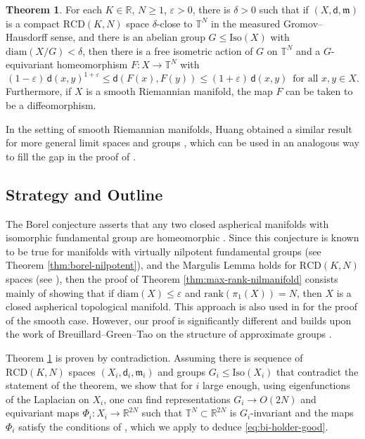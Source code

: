 \documentclass[12pt]{amsart}
\theoremstyle{definition}
\newtheorem{mainthm}{Theorem}
\numberwithin{equation}{section}
\newcommand{\rank}{{\text{rank}}}
\newcommand{\diam}{{\text {diam}}}
\newcommand{\iso}{\text{Iso}}
\newcommand{\rcd}{\text{RCD}}
\newcommand{\mm}{\mathfrak{m}}
\begin{document}
\begin{mainthm}\label{thm:equivariant-torus}
    For each $K \in \mathbb{R}$, $N \geq 1$, $\varepsilon > 0 $, there is $\delta > 0 $ such that if  $(X, \mathsf{d}, \mm  )$ is a compact $\rcd (K,N)$ space $\delta$-close to $\mathbb{T}^N$ in the measured Gromov--Hausdorff sense,  and  there is an abelian group $G \leq \iso (X)$ with $\diam (X / G ) < \delta $, then there is a free isometric action of $G$ on $\mathbb{T}^N$ and a $G$-equivariant homeomorphism $F : X \to \mathbb{T}^N$ with 
    \begin{equation}\label{eq:bi-holder-good}
         (1 - \varepsilon ) \, \mathsf{d}( x,y ) ^{1 + \varepsilon } \leq \mathsf{d}( F (x), F (y)  ) \leq (1 + \varepsilon ) \, \mathsf{d}(x,y) \, \text{ for all } x,y \in X.  
    \end{equation} 
    Furthermore, if $X$ is a smooth Riemannian manifold, the map $F$ can be taken to be a diffeomorphism.     
\end{mainthm}



    In the setting of smooth Riemannian manifolds, Huang obtained a similar result for more general limit spaces and groups  \cite[Corollary 1.9]{huang}, which can be used in an analogous way to fill the gap in the proof of  \cite[Theorem A.1.13]{cheeger-colding-i}.

\subsection{Strategy and Outline}\label{subsec:outline}

The Borel conjecture asserts that any two closed aspherical manifolds with isomorphic fundamental group are homeomorphic \cite{rosenberg}. Since this conjecture is known to be true for manifolds with virtually nilpotent fundamental groups (see Theorem \ref{thm:borel-nilpotent}), and the Margulis Lemma holds for $\rcd (K,N)$ spaces (see \cite{deng-santos-zamora-zhao}), then the proof of Theorem \ref{thm:max-rank-nilmanifold} consists mainly of showing that if $\diam (X) \leq \varepsilon $ and $\rank (\pi_1(X)) = N$, then $X$ is a closed aspherical topological manifold.  This approach is also used in \cite{kapovitch-wilking} for the  proof of the smooth case. However, our proof is significantly different and builds upon the work of Breuillard--Green--Tao on the structure of approximate groups \cite{breuillard-green-tao}. 



Theorem \ref{thm:equivariant-torus} is proven by contradiction. Assuming there is sequence of $\rcd (K,N)$ spaces $(X_i, \mathsf{d}_i, \mm_i)$ and groups $G_i \leq \iso (X_i)$ that contradict the statement of the theorem, we show that for $i$ large enough, using eigenfunctions of the Laplacian on $X_i$, one can find  representations  $G_i \to O(2N) $ and equivariant maps $\Phi_i : X_i \to \mathbb{R}^{2N}$ such that $\mathbb{T}^N \subset \mathbb{R}^{2N}$ is $G_i$-invariant and the maps $\Phi_i$ satisfy the conditions of \cite[Theorem 1.2.2]{honda-peng}, which we apply to deduce \eqref{eq:bi-holder-good}. 
\end{document}
